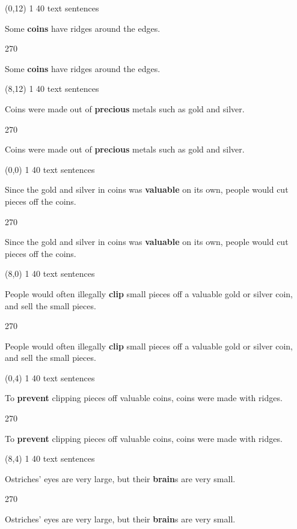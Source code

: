 \documentclass[a4paper]{article}
\newenvironment{itemize*}%
{\begin{itemize}%
 \setlength{\itemsep}{0.5cm}%
 \setlength{\parsep}{0pt}%
 \setlength{\parskip}{0pt}}%
{\end{itemize}}
\newcommand{\mycard}[3]{%
	\small #1 #2
	\par
	\parbox[t][6.8cm][c]{9.5cm}{%
	\par
	\myleft{#3}
	\par
	\myright{#3}
	}
}
\newcommand{\myleft}[1]{%
	\begin{sideways}
	\hspace*{-0.9cm}
		\parbox[t][2.7cm][t]{6.5cm}{%
		\large #1
		}
	\end{sideways}
}
\newcommand{\myright}[1]{%
	\hspace*{6.5cm}
	\begin{turn}{270}
	\hspace*{-7.1cm}
		\parbox[t][2.7cm][t]{6.5cm}{%
		\large #1
		}
	\end{turn}
}
\begin{document}
\begin{textblock}{8}(0,12)
\mycard{1}{40 text sentences}{
\begin{itemize*}
\item Some \textbf{coins} have ridges around the edges.
\end{itemize*}
}
\end{textblock}

\begin{textblock}{8}(8,12)
\mycard{1}{40 text sentences}{
\begin{itemize*}
\item Coins were made out of \textbf{precious} metals such as gold and silver.
\end{itemize*}
}
\end{textblock}

\null
\newpage

\begin{textblock}{8}(0,0)
\mycard{1}{40 text sentences}{
\begin{itemize*}
\item Since the gold and silver in coins was \textbf{valuable} on its own, people would cut pieces off the coins.
\end{itemize*}
}
\end{textblock}

\begin{textblock}{8}(8,0)
\mycard{1}{40 text sentences}{
\begin{itemize*}
\item People would often illegally \textbf{clip} small pieces off a valuable gold or silver coin, and sell the small pieces.
\end{itemize*}
}
\end{textblock}

\begin{textblock}{8}(0,4)
\mycard{1}{40 text sentences}{
\begin{itemize*}
\item To \textbf{prevent} clipping pieces off valuable coins, coins were made with ridges.
\end{itemize*}
}
\end{textblock}

\begin{textblock}{8}(8,4)
\mycard{1}{40 text sentences}{
\begin{itemize*}
\item Ostriches' eyes are very large, but their \textbf{brain}s are very small.
\end{itemize*}
}
\end{textblock}
\end{document}
